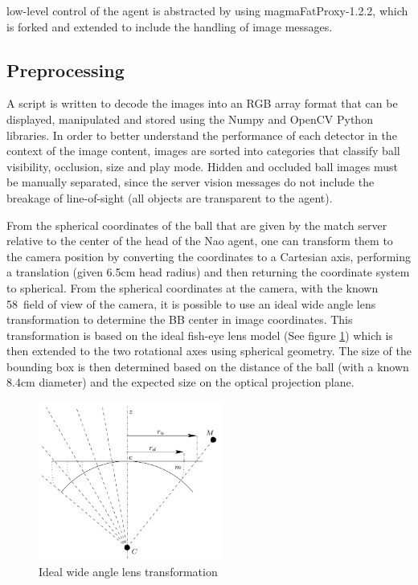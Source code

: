 \documentclass[a4paper,twoside,12pt]{report}
\begin{document}
low-level control of the agent is abstracted by using magmaFatProxy-1.2.2, which is forked and extended to include the handling of image messages.

\subsection{Preprocessing}

A script is written to decode the images into an RGB array format that can be displayed, manipulated and stored using the Numpy and OpenCV Python libraries. In order to better understand the performance of each detector in the context of the image content, images are sorted into categories that classify ball visibility, occlusion, size and play mode. Hidden and occluded ball images must be manually separated, since the server vision messages do not include the breakage of line-of-sight (all objects are transparent to the agent).

From the spherical coordinates of the ball that are given by the match server relative to the center of the head of the Nao agent, one can transform them to the camera position by converting the coordinates to a Cartesian axis, performing a translation (given 6.5cm head radius) and then returning the coordinate system to spherical. From the spherical coordinates at the camera, with the known 58\textdegree\ field of view of the camera, it is possible to use an ideal wide angle lens transformation to determine the BB center in image coordinates. This transformation is based on the ideal fish-eye lens model (See figure \ref{fig:wideangle}) which is then extended to the two rotational axes using spherical geometry. The size of the bounding box is then determined based on the distance of the ball (with a known 8.4cm diameter) and the expected size on the optical projection plane.

\begin{figure}[h!]
\begin{center}
\includegraphics[width=6cm]{images/FOVmodel.jpg}
\caption{Ideal wide angle lens transformation \citep{wideangle} }
\label{fig:wideangle}
\end{center}
\end{figure}
\end{document}
